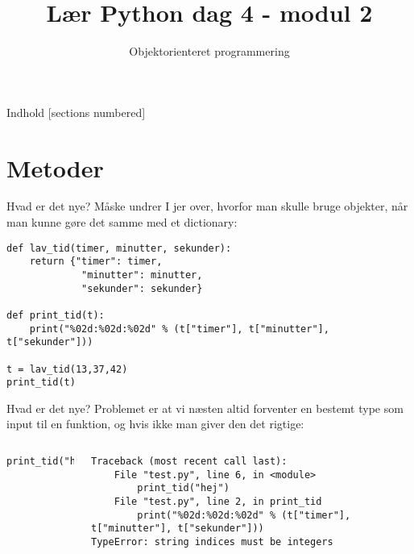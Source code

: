 

\title{Lær Python dag 4 - modul 2}
\subtitle{Objektorienteret programmering}



\maketitle

\begin{frame}{Indhold}
  [sections numbered]
  \tableofcontents[hideallsubsections]
\end{frame}

\section{Metoder}
\begin{frame}[fragile]{Hvad er det nye?}
Måske undrer I jer over, hvorfor man skulle bruge objekter, når man kunne gøre det samme med et dictionary:

\begin{lstlisting}[style=python]
def lav_tid(timer, minutter, sekunder):
	return {"timer": timer, 
			 "minutter": minutter, 
			 "sekunder": sekunder}

def print_tid(t):
	print("%02d:%02d:%02d" % (t["timer"], t["minutter"], t["sekunder"]))
	
t = lav_tid(13,37,42)
print_tid(t)
\end{lstlisting}
\end{frame}



\begin{frame}[fragile]{Hvad er det nye?}
Problemet er at vi næsten altid forventer en bestemt type som input til en funktion, og hvis ikke man giver den det rigtige:
\begin{columns}
	\begin{lstlisting}[style=python]
print_tid("hej")
	\end{lstlisting}
	\pause
	\begin{lstlisting}[style=python]
Traceback (most recent call last):
	File "test.py", line 6, in <module>
		print_tid("hej")
	File "test.py", line 2, in print_tid
		print("%02d:%02d:%02d" % (t["timer"], t["minutter"], t["sekunder"]))
TypeError: string indices must be integers
	\end{lstlisting}
\end{columns}
\end{frame}

